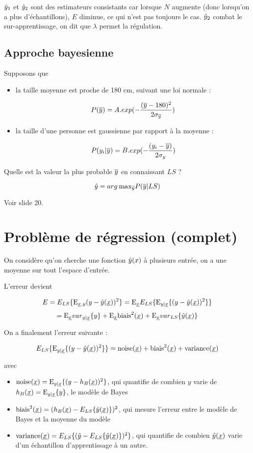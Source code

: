 	$\hat{y}_1$ et $\hat{y}_2$ sont des estimateurs consistants car lorsque $N$ augmente (donc lorsqu'on a plus d'échantillons), $E$ diminue, ce qui n'est pas toujours le cas. $\hat{y}_2$ combat le sur-apprentissage, on dit que $\lambda$ permet la régulation.
	
	
		\subsection{Approche bayesienne}
		
		Supposons que
		
		\begin{itemize}
			\item la taille moyenne est proche de 180 cm, suivant une loi normale :
			
			$$P(\overline{y}) = A.exp(- \frac{(\overline{y} - 180)^2}{2 \sigma_{\overline{y}}})$$
			
			\item la taille d'une personne est gaussienne par rapport à la moyenne :
			
			$$P(y_i \vert \overline{y} ) = B.exp(- \frac{(y_i - \overline{y})}{2 \sigma_y})$$
		\end{itemize}
		
		Quelle est la valeur la plus probable $\overline{y}$ en connaissant $LS$ ?
		
		$$\hat{y} = arg \: \text{max}_{\overline{y}} P(\overline{y} \vert LS)$$
		
		Voir slide 20.
	
	\section{Problème de régression (complet)}
	
	On considère qu'on cherche une fonction $\hat{y}(x)$ à plusieurs entrée, on a une moyenne sur tout l'espace d'entrée.
	
	L'erreur devient
	
	$$E = E_{LS}\{\text{E}_{\underline{x}, y}{(y - \hat{y}(\underline{x}))^2}\} = \text{E}_{\underline{x}}{E_{LS}\{\text{E}_{y \vert \underline{x}} \lbrace (y - \hat{y}(\underline{x}))^2 \rbrace\}}$$
	$$= \text{E}_{\underline{x}}{var_{y\vert \underline{x}}\{y\}} + \text{E}_{\underline{x}}{\text{biais}^2(\underline{x})} + \text{E}_{\underline{x}}{var_{LS}\{\hat{y}(\underline{x})\}}$$
	
	On a finalement l'erreur suivante :
	
	$$E_{LS}\{\text{E}_{y \vert \underline{x}} \lbrace (y - \hat{y}(\underline{x}))^2 \rbrace\} = \text{noise}(\underline{x}) + \text{biais}^2(\underline{x}) + \text{variance}(\underline{x})$$
	
	avec
	
	\begin{itemize}
		\item $\text{noise}(\underline{x}) = \text{E}_{y \vert \underline{x}} \lbrace (y - h_B(\underline{x}))^2 \rbrace$, qui quantifie de combien $y$ varie de $h_B(\underline{x}) = \text{E}_{y \vert \underline{x}} \lbrace y \rbrace$, le modèle de Bayes
		\item $\text{biais}^2(\underline{x}) = (h_B(\underline{x}) - E_{LS}\{\hat{y}(\underline{x})\})^2$, qui mesure l'erreur entre le modèle de Bayes et la moyenne du modèle
		\item $\text{variance}(\underline{x}) = E_{LS}\{(\hat{y} - E_{LS}\{\hat{y}(\underline{x})\})^2\}$, qui quantifie de combien $\hat{y}(\underline{x})$ varie d'un échantillon d'apprentissage à un autre.
	\end{itemize}
	
